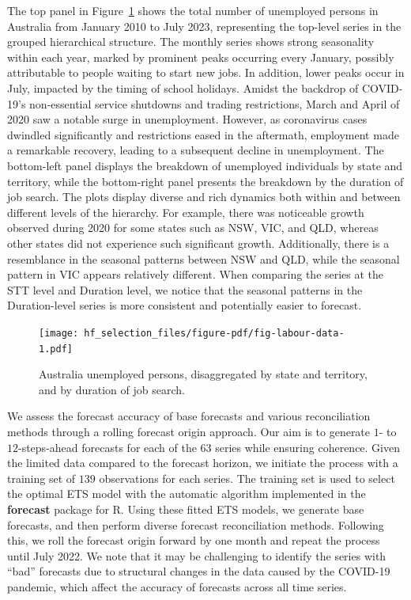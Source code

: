 \documentclass[11pt,a4paper,]{article}
\begin{document}
The top panel in Figure~\ref{fig-labour-data} shows the total number of
unemployed persons in Australia from January 2010 to July 2023,
representing the top-level series in the grouped hierarchical structure.
The monthly series shows strong seasonality within each year, marked by
prominent peaks occurring every January, possibly attributable to people
waiting to start new jobs. In addition, lower peaks occur in July,
impacted by the timing of school holidays. Amidst the backdrop of
COVID-19's non-essential service shutdowns and trading restrictions,
March and April of 2020 saw a notable surge in unemployment. However, as
coronavirus cases dwindled significantly and restrictions eased in the
aftermath, employment made a remarkable recovery, leading to a
subsequent decline in unemployment. The bottom-left panel displays the
breakdown of unemployed individuals by state and territory, while the
bottom-right panel presents the breakdown by the duration of job search.
The plots display diverse and rich dynamics both within and between
different levels of the hierarchy. For example, there was noticeable
growth observed during 2020 for some states such as NSW, VIC, and QLD,
whereas other states did not experience such significant growth.
Additionally, there is a resemblance in the seasonal patterns between
NSW and QLD, while the seasonal pattern in VIC appears relatively
different. When comparing the series at the STT level and Duration
level, we notice that the seasonal patterns in the Duration-level series
is more consistent and potentially easier to forecast.

\begin{figure}

{\centering \texttt{[image: hf\_selection\_files/figure-pdf/fig-labour-data-1.pdf]}

}

\caption{\label{fig-labour-data}Australia unemployed persons,
disaggregated by state and territory, and by duration of job search.}

\end{figure}

We assess the forecast accuracy of base forecasts and various
reconciliation methods through a rolling forecast origin approach. Our
aim is to generate \(1\)- to \(12\)-steps-ahead forecasts for each of
the \(63\) series while ensuring coherence. Given the limited data
compared to the forecast horizon, we initiate the process with a
training set of \(139\) observations for each series. The training set
is used to select the optimal ETS model with the automatic algorithm
implemented in the \textbf{forecast} package for R. Using these fitted
ETS models, we generate base forecasts, and then perform diverse
forecast reconciliation methods. Following this, we roll the forecast
origin forward by one month and repeat the process until July 2022. We
note that it may be challenging to identify the series with ``bad''
forecasts due to structural changes in the data caused by the COVID-19
pandemic, which affect the accuracy of forecasts across all time series.
\end{document}
